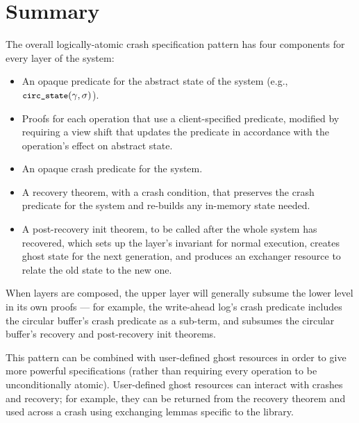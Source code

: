 \section{Summary}

The overall logically-atomic crash specification pattern has four components for
every layer of the system:

\begin{itemize}
  \item An opaque predicate for the abstract state of the system (e.g.,
        $\circstate(\gamma, \sigma)$).
  \item Proofs for each operation that use a client-specified predicate,
        modified by requiring a view shift that updates the predicate in
        accordance with the operation's effect on abstract state.
  \item An opaque crash predicate for the system.
  \item A recovery theorem, with a crash condition, that preserves the crash
  predicate for the system and re-builds any in-memory state needed.
  \item A post-recovery init theorem, to be called after the whole system has
        recovered, which sets up the layer's invariant for normal execution,
        creates ghost state for the next generation, and produces an exchanger
        resource to relate the old state to the new one.
\end{itemize}

When layers are composed, the upper layer will generally subsume the lower level
in its own proofs --- for example, the write-ahead log's crash predicate
includes the circular buffer's crash predicate as a sub-term, and subsumes the
circular buffer's recovery and post-recovery init theorems.

This pattern can be combined with user-defined ghost resources in order to give
more powerful specifications (rather than requiring every operation to be
unconditionally atomic). User-defined ghost resources can interact with crashes
and recovery; for example, they can be returned from the recovery theorem and
used across a crash using exchanging lemmas specific to the library.
